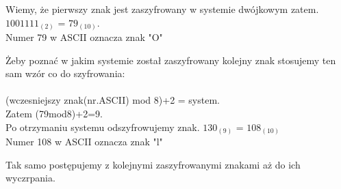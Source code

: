 \documentclass{article}
\begin{document}
Wiemy, że pierwszy znak jest zaszyfrowany w systemie dwójkowym zatem.\\
$1001111_{(2)}$ = $79_{(10)}$.\\
Numer 79 w ASCII oznacza znak "O"

Żeby poznać w jakim systemie został zaszyfrowany kolejny znak stosujemy ten sam wzór co do szyfrowania:\\\\
(wczesniejszy znak(nr.ASCII) mod 8)+2 = system.\\

Zatem (79mod8)+2=9.\\
Po otrzymaniu systemu odszyfrowujemy znak.
$130_{(9)}$ = $108_{(10)}$\\
Numer 108 w ASCII oznacza znak "l"

Tak samo postępujemy z kolejnymi zaszyfrowanymi znakami aż do ich wyczrpania.
\end{document}
